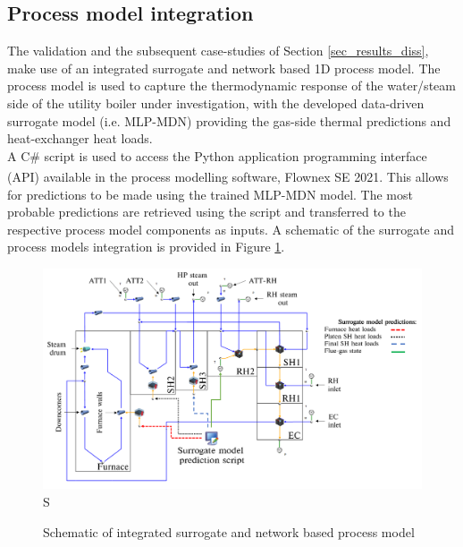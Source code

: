 \documentclass[a4paper,fleqn]{cas-sc}
\begin{document}
\subsection{Process model integration}
The validation and the subsequent case-studies of Section \ref{sec_results_diss}, make use of an integrated surrogate and network based 1D process model. The process model is used to capture the thermodynamic response of the water/steam side of the utility boiler under investigation, with the developed data-driven surrogate model (i.e. MLP-MDN) providing the gas-side thermal predictions and heat-exchanger heat loads.\\

A C\# script is used to access the Python application programming interface (API) available in the process modelling software, Flownex SE\textsuperscript{\textregistered} 2021. This allows for predictions to be made using the trained MLP-MDN model. The most probable predictions are retrieved using the script and transferred to the respective process model components as inputs. A schematic of the surrogate and process models integration is provided in Figure \ref{fig_int_model}.\\
\begin{figure}[h!]
	\centering
		\includegraphics[scale=0.15]{INTEGRATED_MODEL}S
	  \caption{Schematic of integrated surrogate and network based process model}\label{fig_int_model}
\end{figure}
\end{document}
